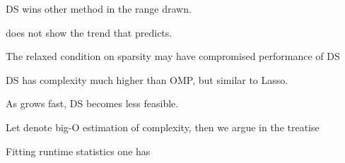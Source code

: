 {
\I DS wins other method in the range drawn.

\I \m {\chi} does not show the trend that \m {\T {\chi}} predicts.

\I The relaxed condition on sparsity may have compromised performance of DS

\I DS has complexity much higher than OMP, but similar to Lasso.

\I As  grows fast, DS becomes less feasible.
}
{
\I Let  denote big-O estimation of complexity, then we argue in the treatise

\I Fitting runtime statistics one has
}


